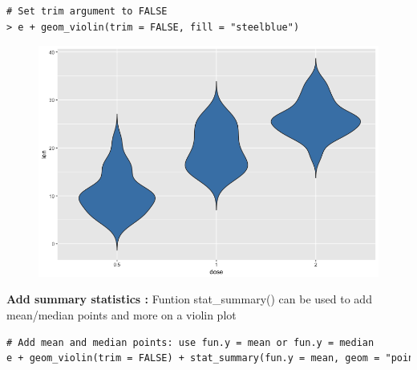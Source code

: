 \begin{lstlisting}[language=html]
# Set trim argument to FALSE
> e + geom_violin(trim = FALSE, fill = "steelblue")
\end{lstlisting}
\begin{figure}[H]\begin{center}\includegraphics[scale=1 ]{ilu/bg91.png}\end{center}\end{figure}

\textbf{Add summary statistics : } Funtion stat\_summary() can be used to add mean/median points and more on a violin plot
\begin{lstlisting}[language=html]
# Add mean and median points: use fun.y = mean or fun.y = median
e + geom_violin(trim = FALSE) + stat_summary(fun.y = mean, geom = "point", shape = 23, size = 2, color = "blue")
\end{lstlisting}


